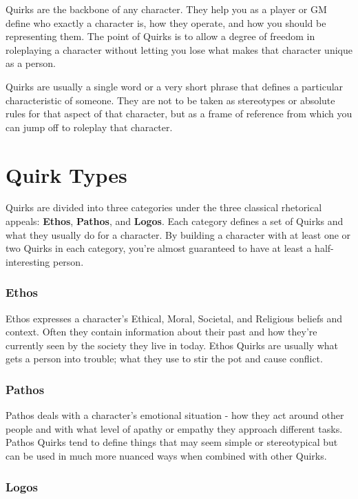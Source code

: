 \documentclass[../main.tex]{subfiles}
\begin{document}
    Quirks are the backbone of any character. They help you as a player or GM define who exactly a character is, how they operate, and how you should be representing them. The point of Quirks is to allow a degree of freedom in roleplaying a character without letting you lose what makes that character unique as a person.

    Quirks are usually a single word or a very short phrase that defines a particular characteristic of someone. They are not to be taken as stereotypes or absolute rules for that aspect of that character, but as a frame of reference from which you can jump off to roleplay that character. 
      
    \section{Quirk Types}

    Quirks are divided into three categories under the three classical rhetorical appeals: \textbf{Ethos}, \textbf{Pathos}, and \textbf{Logos}. Each category defines a set of Quirks and what they usually do for a character. By building a character with at least one or two Quirks in each category, you're almost guaranteed to have at least a half-interesting person.

    \subsubsection{Ethos}

    Ethos expresses a character's Ethical, Moral, Societal, and Religious beliefs and context. Often they contain information about their past and how they're currently seen by the society they live in today. Ethos Quirks are usually what gets a person into trouble; what they use to stir the pot and cause conflict.

    \subsubsection{Pathos}

    Pathos deals with a character's emotional situation - how they act around other people and with what level of apathy or empathy they approach different tasks. Pathos Quirks tend to define things that may seem simple or stereotypical but can be used in much more nuanced ways when combined with other Quirks.

    \subsubsection{Logos}
\end{document}
